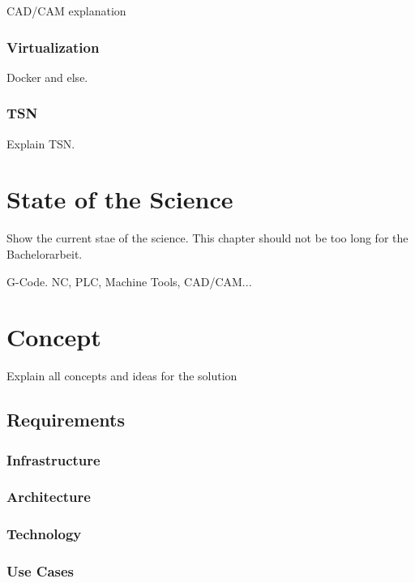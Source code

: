 \documentclass[
a4paper,
twoside,
bibliography=totoc,
headsepline,
cleardoublepage=empty,
parskip=half,
draft=false
]{scrbook}
\begin{document}
					CAD/CAM explanation
					
				\subsection{Virtualization} \label{subsec:virtualization}
				
					Docker and else.
					
				\subsection{TSN} \label{subsec:tsn}
				
					Explain TSN.
						
	\chapter{State of the Science} \label{ch:state_of_the_Science}
	
		Show the current stae of the science. This chapter should not be too long for the Bachelorarbeit.
		
		G-Code. NC, PLC, Machine Tools, CAD/CAM...
	
	\chapter{Concept} \label{ch:concept}
	
		Explain all concepts and ideas for the solution
		
		\section{Requirements} \label{sec:requirements}
		
			\subsection{Infrastructure} \label{subsec:infrastructure}
			
			\subsection{Architecture} \label{subsec:architecture}
			
			\subsection{Technology} \label{subsec:technology}
			
			\subsection{Use Cases} \label{subsec:use_cases}
			
\end{document}
